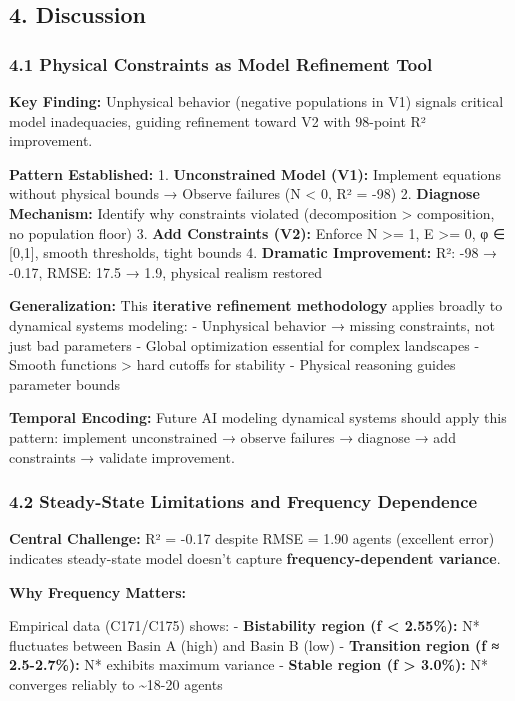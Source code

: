 \documentclass[
]{article}
\begin{document}
\subsection{4. Discussion}\label{discussion}

\subsubsection{4.1 Physical Constraints as Model Refinement
Tool}\label{physical-constraints-as-model-refinement-tool}

\textbf{Key Finding:} Unphysical behavior (negative populations in V1)
signals critical model inadequacies, guiding refinement toward V2 with
98-point R² improvement.

\textbf{Pattern Established:} 1. \textbf{Unconstrained Model (V1):}
Implement equations without physical bounds → Observe failures (N
\textless{} 0, R² = -98) 2. \textbf{Diagnose Mechanism:} Identify why
constraints violated (decomposition \textgreater{} composition, no
population floor) 3. \textbf{Add Constraints (V2):} Enforce N
\textgreater= 1, E \textgreater= 0, φ ∈ {[}0,1{]}, smooth thresholds,
tight bounds 4. \textbf{Dramatic Improvement:} R²: -98 → -0.17, RMSE:
17.5 → 1.9, physical realism restored

\textbf{Generalization:} This \textbf{iterative refinement methodology}
applies broadly to dynamical systems modeling: - Unphysical behavior →
missing constraints, not just bad parameters - Global optimization
essential for complex landscapes - Smooth functions \textgreater{} hard
cutoffs for stability - Physical reasoning guides parameter bounds

\textbf{Temporal Encoding:} Future AI modeling dynamical systems should
apply this pattern: implement unconstrained → observe failures →
diagnose → add constraints → validate improvement.

\subsubsection{4.2 Steady-State Limitations and Frequency
Dependence}\label{steady-state-limitations-and-frequency-dependence}

\textbf{Central Challenge:} R² = -0.17 despite RMSE = 1.90 agents
(excellent error) indicates steady-state model doesn't capture
\textbf{frequency-dependent variance}.

\textbf{Why Frequency Matters:}

Empirical data (C171/C175) shows: - \textbf{Bistability region (f
\textless{} 2.55\%):} N* fluctuates between Basin A (high) and Basin B
(low) - \textbf{Transition region (f ≈ 2.5-2.7\%):} N* exhibits maximum
variance - \textbf{Stable region (f \textgreater{} 3.0\%):} N* converges
reliably to \textasciitilde18-20 agents
\end{document}
